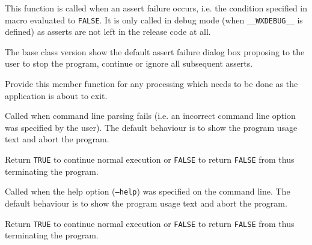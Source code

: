 This function is called when an assert failure occurs, i.e. the condition
specified in  macro evaluated to {\tt FALSE}.
It is only called in debug mode (when {\tt \_\_WXDEBUG\_\_} is defined) as
asserts are not left in the release code at all.

The base class version show the default assert failure dialog box proposing to
the user to stop the program, continue or ignore all subsequent asserts.





\label{wxapponexit}


Provide this member function for any processing which needs to be done as
the application is about to exit.

\label{wxapponcmdlineerror}


Called when command line parsing fails (i.e. an incorrect command line option
was specified by the user). The default behaviour is to show the program usage
text and abort the program.

Return {\tt TRUE} to continue normal execution or {\tt FALSE} to return 
{\tt FALSE} from  thus terminating the program.



\label{wxapponcmdlinehelp}


Called when the help option ({\tt --help}) was specified on the command line.
The default behaviour is to show the program usage text and abort the program.

Return {\tt TRUE} to continue normal execution or {\tt FALSE} to return 
{\tt FALSE} from  thus terminating the program.

